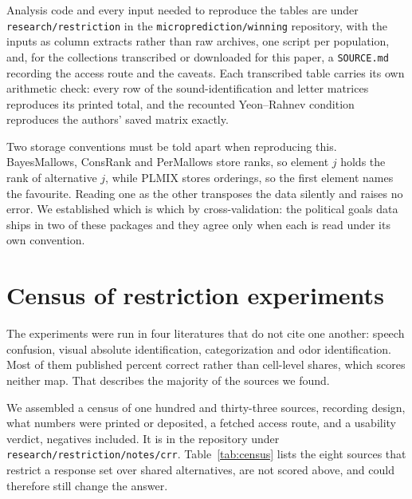\documentclass[11pt]{article}
\begin{document}
\begin{sloppypar}
Analysis code and every input needed to reproduce the tables are under
\texttt{research/\allowbreak restriction} in the \texttt{microprediction/\allowbreak winning}
repository, with the
inputs as column extracts rather than raw archives, one script per population, and, for the
collections transcribed or downloaded for this paper, a \texttt{SOURCE.md} recording the
access route and the caveats. Each transcribed table carries its own arithmetic check: every
row of the sound-identification and letter matrices reproduces its printed total, and the
recounted Yeon--Rahnev condition reproduces the authors' saved matrix exactly.
\end{sloppypar}

Two storage conventions must be told apart when reproducing this. BayesMallows,
ConsRank and PerMallows store ranks, so element $j$ holds the rank of alternative $j$,
while PLMIX stores orderings, so the first element names the favourite. Reading one as
the other transposes the data silently and raises no error. We established which is
which by cross-validation: the political goals data ships in two of these packages and
they agree only when each is read under its own convention.

\appendix
\section{Census of restriction experiments}
\label{sec:census}

The experiments were run in four literatures that do not cite one another: speech confusion,
visual absolute identification, categorization and odor identification. Most of them published
percent correct rather than cell-level shares, which scores neither map. That describes the
majority of the sources we found.

We assembled a census of one hundred and thirty-three sources, recording design, what numbers were printed
or deposited, a fetched access route, and a usability verdict, negatives included. It is in the repository under
\texttt{research/restriction/notes/crr}. Table~\ref{tab:census} lists the eight sources that restrict a
response set over shared alternatives, are not scored above, and could therefore still change
the answer.
\end{document}
